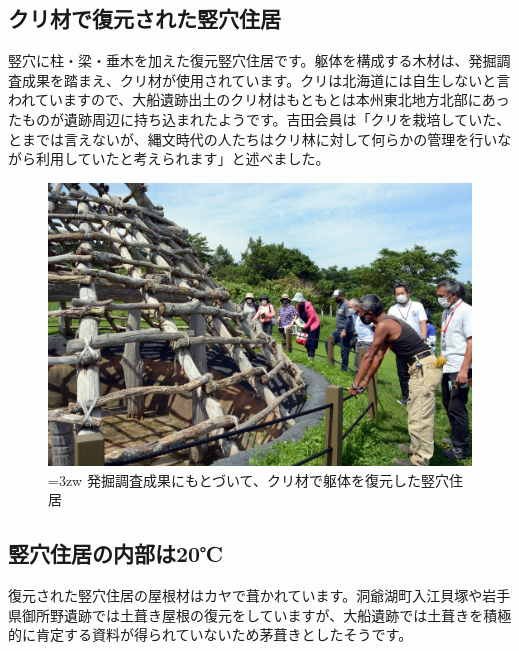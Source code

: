 \documentclass[a4j,11pt,twocolumn,openany]{jsbook}
\begin{document}
\subsection{クリ材で復元された竪穴住居}

竪穴に柱・梁・垂木を加えた復元竪穴住居です。躯体を構成する木材は、発掘調査成果を踏まえ、クリ材が使用されています。クリは北海道には自生しないと言われていますので、大船遺跡出土のクリ材はもともとは本州東北地方北部にあったものが遺跡周辺に持ち込まれたようです。吉田会員は「クリを栽培していた、とまでは言えないが、縄文時代の人たちはクリ林に対して何らかの管理を行いながら利用していたと考えられます」と述べました。

\begin{figure}[ht]
	\centering
	\includegraphics[width=\linewidth]{fig/01_Iseki_kengaku/04_Ofune_house.JPG}
	\caption{\hangindent=3zw
		発掘調査成果にもとづいて、クリ材で躯体を復元した竪穴住居}
	\label{}
\end{figure}

\subsection{竪穴住居の内部は20℃}

復元された竪穴住居の屋根材はカヤで葺かれています。洞爺湖町入江貝塚や岩手県御所野遺跡では土葺き屋根の復元をしていますが、大船遺跡では土葺きを積極的に肯定する資料が得られていないため茅葺きとしたそうです。
\end{document}
